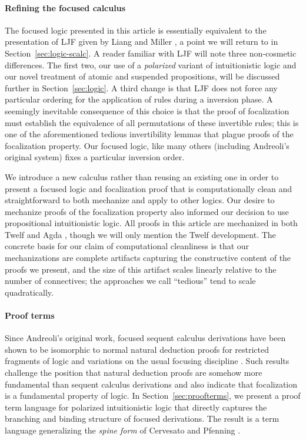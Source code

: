 \documentclass[acmtocl]{robtrans}\pdfoutput=1
\begin{document}
\paragraph*{Refining the focused calculus}
The focused logic presented in this article is essentially equivalent
to the presentation of LJF given by Liang and Miller
, a point we will return to in
Section~\ref{sec:logic-scalc}. A reader familiar with LJF will note
three non-cosmetic differences.  The first two, our use of a {\it
  polarized} variant of intuitionistic logic and our novel treatment
of atomic and suspended propositions, will be discussed further in
Section~\ref{sec:logic}.  A third change is that LJF does not force
any particular ordering for the application of rules during a
inversion phase. A seemingly inevitable consequence of this choice is
that the proof of focalization must establish the equivalence of all
permutations of these invertible rules; this is one of the
aforementioned tedious invertibility lemmas that plague proofs of the
focalization property. Our focused logic, like many others (including
Andreoli's original system) fixes a particular inversion order.

We introduce a new calculus rather than reusing an existing one in
order to present a focused logic and focalization proof that is
computationally clean and straightforward to both mechanize and
apply to other logics.  Our desire to
mechanize proofs of the focalization property also informed our
decision to use propositional intuitionistic logic.
All proofs in this
article are mechanized in both Twelf \cite{pfenning99system} and Agda
\cite{norell08towards}, though we will only mention the Twelf
development.
The concrete
basis for our claim of computational cleanliness is that our
mechanizations are complete artifacts capturing the constructive
content of the proofs we present, 
and the size of this artifact scales linearly
relative to the number of connectives; the approaches we call
``tedious'' tend to scale quadratically.

\paragraph*{Proof terms}
Since Andreoli's original work, focused sequent calculus derivations
have been shown to be isomorphic to normal natural deduction proofs
for restricted fragments of logic \cite{cervesato03linear} and
variations on the usual focusing discipline \cite{howe01proof}.  Such
results challenge the position that natural deduction proofs are
somehow more fundamental than sequent calculus derivations and also
indicate that focalization is a fundamental property of logic. In
Section~\ref{sec:proofterms}, we present a proof term language for
polarized intuitionistic logic that directly captures the branching
and binding structure of focused derivations. The result is a term
language generalizing the {\it spine form} of Cervesato and Pfenning
.
\end{document}

